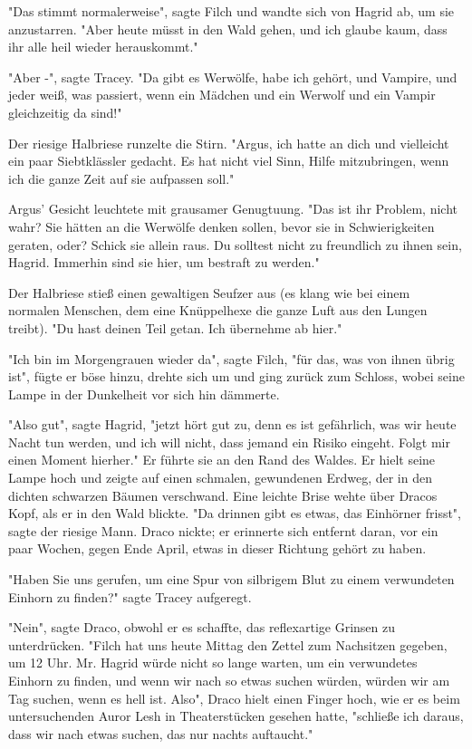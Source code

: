 {"Das stimmt normalerweise", sagte Filch und wandte sich von Hagrid ab, um sie anzustarren. "Aber heute müsst in den Wald gehen, und ich glaube kaum, dass ihr alle heil wieder herauskommt."

"Aber -", sagte Tracey. "Da gibt es Werwölfe, habe ich gehört, und Vampire, und jeder weiß, was passiert, wenn ein Mädchen und ein Werwolf und ein Vampir gleichzeitig da sind!"

Der riesige Halbriese runzelte die Stirn. "Argus, ich hatte an dich und vielleicht ein paar Siebtklässler gedacht. Es hat nicht viel Sinn, Hilfe mitzubringen, wenn ich die ganze Zeit auf sie aufpassen soll."

Argus' Gesicht leuchtete mit grausamer Genugtuung. "Das ist ihr Problem, nicht wahr? Sie hätten an die Werwölfe denken sollen, bevor sie in Schwierigkeiten geraten, oder? Schick sie allein raus. Du solltest nicht zu freundlich zu ihnen sein, Hagrid. Immerhin sind sie hier, um bestraft zu werden."

Der Halbriese stieß einen gewaltigen Seufzer aus (es klang wie bei einem normalen Menschen, dem eine Knüppelhexe die ganze Luft aus den Lungen treibt). "Du hast deinen Teil getan. Ich übernehme ab hier."

"Ich bin im Morgengrauen wieder da", sagte Filch, "für das, was von ihnen übrig ist", fügte er böse hinzu, drehte sich um und ging zurück zum Schloss, wobei seine Lampe in der Dunkelheit vor sich hin dämmerte.

"Also gut", sagte Hagrid, "jetzt hört gut zu, denn es ist gefährlich, was wir heute Nacht tun werden, und ich will nicht, dass jemand ein Risiko eingeht. Folgt mir einen Moment hierher." Er führte sie an den Rand des Waldes. Er hielt seine Lampe hoch und zeigte auf einen schmalen, gewundenen Erdweg, der in den dichten schwarzen Bäumen verschwand. Eine leichte Brise wehte über Dracos Kopf, als er in den Wald blickte. "Da drinnen gibt es etwas, das Einhörner frisst", sagte der riesige Mann. Draco nickte; er erinnerte sich entfernt daran, vor ein paar Wochen, gegen Ende April, etwas in dieser Richtung gehört zu haben.

"Haben Sie uns gerufen, um eine Spur von silbrigem Blut zu einem verwundeten Einhorn zu finden?" sagte Tracey aufgeregt.

"Nein", sagte Draco, obwohl er es schaffte, das reflexartige Grinsen zu unterdrücken. "Filch hat uns heute Mittag den Zettel zum Nachsitzen gegeben, um 12 Uhr. Mr. Hagrid würde nicht so lange warten, um ein verwundetes Einhorn zu finden, und wenn wir nach so etwas suchen würden, würden wir am Tag suchen, wenn es hell ist. Also", Draco hielt einen Finger hoch, wie er es beim untersuchenden Auror Lesh in Theaterstücken gesehen hatte, "schließe ich daraus, dass wir nach etwas suchen, das nur nachts auftaucht."

}
